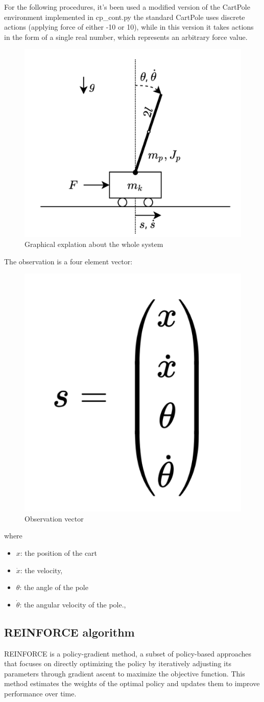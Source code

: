 \documentclass{article}
\begin{document}
For the following procedures, it's been used a modified version of the CartPole environment implemented in cp\_cont.py the standard CartPole uses discrete actions (applying force of either -10 or 10), while in this version it takes actions in the form of a single real number, which represents an arbitrary force value.
\begin{figure}[h]
	\centering
	\includegraphics[width=0.5\linewidth]{../data/images/cart.png}
	\caption{Graphical explation about the whole system}
	\label{fig:plot1}
\end{figure}

\newpage

The observation is a four element vector: 
\begin{figure}[h]
	\centering
	\includegraphics[width=0.2\linewidth]{../data/images/vector.png}
	\caption{Observation vector}
	\label{fig:plot2}
\end{figure}

where 
\begin{itemize}
	\item $x$: the position of the cart
	\item $\dot{x}$: the velocity, 
	\item $\theta$:  the angle of the pole
	\item $\dot{\theta}$: the angular velocity of the pole., 	
\end{itemize}

\subsection{REINFORCE algorithm}
REINFORCE is a policy-gradient method, a subset of policy-based approaches that focuses on directly optimizing the policy by iteratively adjusting its parameters through gradient ascent to maximize the objective function. This method estimates the weights of the optimal policy and updates them to improve performance over time.
\end{document}
